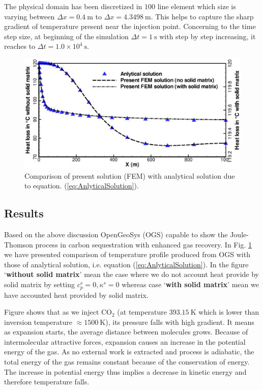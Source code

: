 The physical domain has been discretized in $100$ line element which size is varying between $\Delta x=0.4~\mathrm{m}$ to $\Delta x= 4.3498~\mathrm m$. This helps to capture the sharp gradient of temperature present near the injection point. Concerning to the time step size, at beginning of the simulation $\Delta t=1~\mathrm s$ with step by step increasing, it reaches to $\Delta t=1.0\times10^4~\mathrm s$.


\begin{figure}[htb!]
\centering
\includegraphics[scale=0.35]{PART_II/G/JTCooling.eps}
\caption{\label{fig:JTComparison}Comparison of present solution (FEM) with analytical solution due to equation. (\ref{eq:AnlyticalSolution}).}
\end{figure}
\subsection{Results}
Based on the above discussion OpenGeoSys (OGS) capable to show the Joule-Thomson process in carbon sequestration with enhanced gas recovery. In Fig. \ref{fig:JTComparison} we have presented comparison of temperature profile produced from OGS with those of analytical solution, i.e. equation (\ref{eq:AnlyticalSolution}). In the figure `\textbf{without solid matrix}' mean the case where we do not account heat provide by solid matrix by setting $c_p^s=0, \kappa^s=0$ whereas case `\textbf{with solid matrix}' mean we have accounted heat provided by solid matrix.


Figure shows that as we inject $\mathrm {CO_2}$ (at temperature $393.15~\mathrm K$ which is lower than inversion temperature $\approx 1500~\mathrm K$), its pressure falls with high gradient. It means as expansion starts, the average distance between molecules grows. Because of intermolecular attractive forces, expansion causes an increase in the potential energy of the gas. As no external work is extracted and process is adiabatic, the total energy of the gas remains constant because of the conservation of energy. The increase in potential energy thus implies a decrease in kinetic energy and therefore temperature falls.